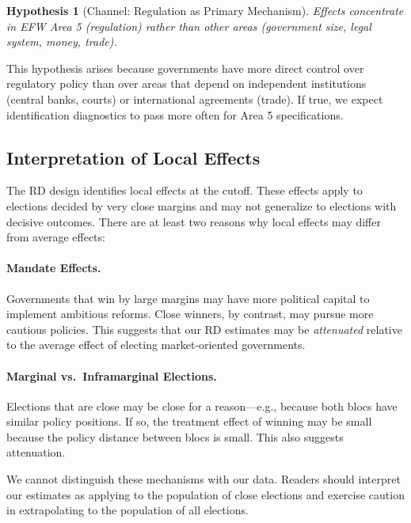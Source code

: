 \documentclass[12pt,a4paper]{article}
\newtheorem{hypothesis}{Hypothesis}
\begin{document}
\begin{hypothesis}[Channel: Regulation as Primary Mechanism]
\label{hyp:regulation}
Effects concentrate in EFW Area 5 (regulation) rather than other areas 
(government size, legal system, money, trade).
\end{hypothesis}

This hypothesis arises because governments have more direct control over 
regulatory policy than over areas that depend on independent institutions 
(central banks, courts) or international agreements (trade). If true, we 
expect identification diagnostics to pass more often for Area 5 specifications.

\subsection{Interpretation of Local Effects}

The RD design identifies local effects at the cutoff. These effects 
apply to elections decided by very close margins and may not generalize 
to elections with decisive outcomes. There are at least two reasons 
why local effects may differ from average effects:

\paragraph{Mandate Effects.}
Governments that win by large margins may have more political capital 
to implement ambitious reforms. Close winners, by contrast, may pursue 
more cautious policies. This suggests that our RD estimates may be 
\textit{attenuated} relative to the average effect of electing 
market-oriented governments.

\paragraph{Marginal vs.\ Inframarginal Elections.}
Elections that are close may be close for a reason---e.g., because 
both blocs have similar policy positions. If so, the treatment effect 
of winning may be small because the policy distance between blocs is 
small. This also suggests attenuation.

We cannot distinguish these mechanisms with our data. Readers should 
interpret our estimates as applying to the population of close elections 
and exercise caution in extrapolating to the population of all elections.

\end{document}
